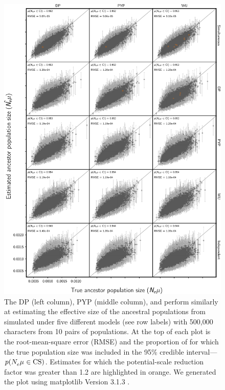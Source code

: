 
\begin{figure}[htbp]
    \begin{center}
        \includegraphics[width=\textwidth,height=0.9\textheight,keepaspectratio]{../images/from-project-repo/infer-columns-by-data-rows-ancestor-size-scatter-cropped.pdf}
        \captionsetup{name=Figure S, labelformat=noSpace, listformat=sFigList}
        \caption{\footnotesize
        The DP (left column),
        PYP (middle column),
        and
        \wunif
        perform similarly at estimating the effective size of the
        ancestral populations from \datasets simulated under five different
        models (see row labels) with 500,000 characters from 10 pairs of
        populations.
        At the top of each plot is the root-mean-square error (RMSE)
        and
        the proportion of \datasets for which the true population size was
        included in the 95\% credible interval---$p(N_{e}^{}\mu_{} \in
        \textrm{CS})$.
        Estimates for which the potential-scale reduction factor was greater
        than 1.2 \citep{Brooks1998} are highlighted in orange.
        We generated the plot using matplotlib Version 3.1.3
        \citep{matplotlib}.
        }
        \label{fig:ancpopsizegrid}
    \end{center}
\end{figure}

